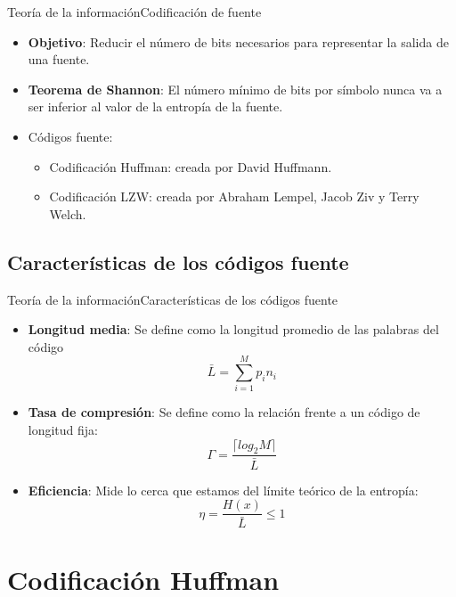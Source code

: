 \documentclass[10pt,compress]{beamer} %
\begin{document}
\begin{frame}{Teoría de la información}{Codificación de fuente}
  \begin{itemize}
  \item {\bf Objetivo}: Reducir el número de bits necesarios para representar la salida de una fuente. 
  \item {\bf Teorema de Shannon}: El número mínimo de bits por símbolo nunca va a ser inferior al valor de la entropía de la fuente.
  \item Códigos fuente:
  \begin{itemize}
    \item Codificación Huffman: creada por David Huffmann.
    \item Codificación LZW: creada por Abraham Lempel, Jacob Ziv y Terry Welch. 
  \end{itemize}
\end{itemize}
\end{frame}

\subsection{Características de los códigos fuente}
\begin{frame}{Teoría de la información}{Características de los códigos fuente}
  \begin{itemize}
    \item {\bf Longitud media}: Se define como la longitud promedio de las palabras del código
    \begin{displaymath}
      \bar{L} = \sum_{i=1}^M p_i n_i	
    \end{displaymath}
    \item {\bf Tasa de compresión}: Se define como la relación frente a un código de longitud fija:
    \begin{displaymath}
      \Gamma = \frac{\lceil log_2 M \rceil}{\bar{L}}	
    \end{displaymath}
    \item {\bf Eficiencia}: Mide lo cerca que estamos del límite teórico de la entropía:
    \begin{displaymath}
      \eta = \frac{H(x)}{\bar{L}} \leq 1	
    \end{displaymath}
  \end{itemize}
\end{frame}


\section{Codificación Huffman}
\end{document}
